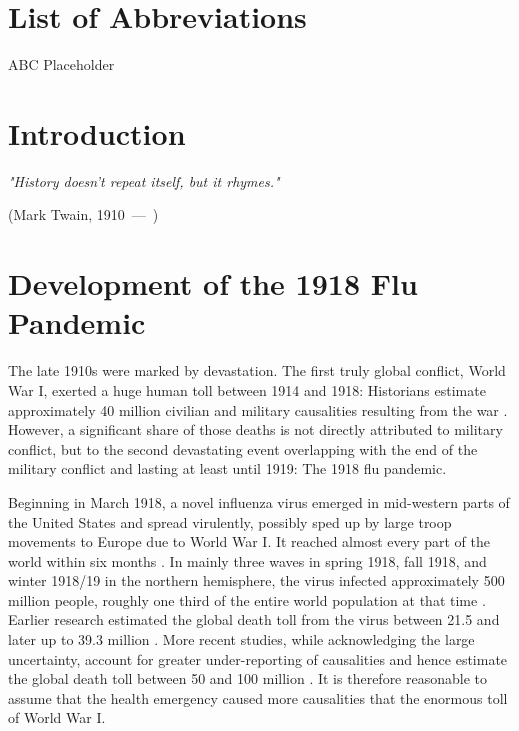\documentclass[12pt,a4paper]{article}
\let\oldquote\quote
\let\endoldquote\endquote
\renewenvironment{quote}[2][]
{\if\relax\detokenize{#1}\relax
	\def\quoteauthor{#2}%
	\else
	\def\quoteauthor{#2~---~#1}%
	\fi
	\oldquote}
{\par\nobreak\smallskip\hfill(\quoteauthor)%
	\endoldquote\addvspace{\bigskipamount}}
\begin{document}
\section*{List of Abbreviations}
 
\begin{abbrv}
 
\item[ABC]			Placeholder

 
\end{abbrv}
\newpage
\setcounter{page}{2}
\setlength{\baselineskip}{1.5\baselineskip}
\pagestyle{plain}


\section{Introduction}

\begin{quote}{Mark Twain, 1910}
	\textit{"History doesn't repeat itself, but it rhymes."}
\end{quote}


\section{Development of the 1918 Flu Pandemic}

The late 1910s were marked by devastation.
The first truly global conflict, World War I, exerted a huge human toll between 1914 and 1918:
Historians estimate approximately 40 million civilian and military causalities resulting from the war \citep{royde-smithWorldWarKilled2020}.
However, a significant share of those deaths is not directly attributed to military conflict,
but to the second devastating event overlapping with the end of the military conflict and lasting at least until 1919: The 1918 flu pandemic.

Beginning in March 1918, a novel influenza virus emerged in mid-western parts of the United States and spread virulently, possibly sped up by large troop movements to Europe due to World War I. It reached almost every part of the world within six months \citep{pattersonGeographyMortality19181991}.
In mainly three waves in spring 1918, fall 1918, and winter 1918/19 in the northern hemisphere, the virus infected approximately 500 million people, roughly one third of the entire world population at that time \citep{taubenberger1918InfluenzaMother2006}.
Earlier research estimated the global death toll from the virus between 21.5 \cite{jordanEpidemicInfluenzaSurvey1927} and later up to 39.3 million \citep{pattersonGeographyMortality19181991}.
More recent studies, while acknowledging the large uncertainty, account for greater under-reporting of causalities and hence estimate the global death toll between 50 and 100 million \citep{johnsonUpdatingAccountsGlobal2002}.
It is therefore reasonable to assume that the health emergency caused more causalities that the enormous toll of World War I.
\end{document}
